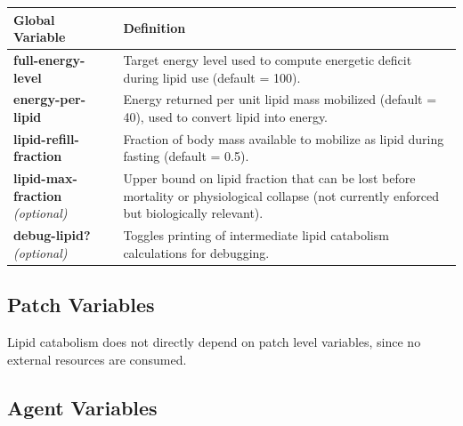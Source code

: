 \documentclass[
]{book}
\begin{document}
\begin{longtable}[]{@{}
  >{\raggedright\arraybackslash}p{}
  >{\raggedright\arraybackslash}p{}@{}}
\toprule\noalign{}
\begin{minipage}[b]{\linewidth}\raggedright
Global Variable
\end{minipage} & \begin{minipage}[b]{\linewidth}\raggedright
Definition
\end{minipage} \\
\midrule\noalign{}
\endhead
\bottomrule\noalign{}
\endlastfoot
\textbf{full-energy-level} & Target energy level used to compute energetic deficit during lipid use (default = 100). \\
\textbf{energy-per-lipid} & Energy returned per unit lipid mass mobilized (default = 40), used to convert lipid into energy. \\
\textbf{lipid-refill-fraction} & Fraction of body mass available to mobilize as lipid during fasting (default = 0.5). \\
\textbf{lipid-max-fraction} \emph{(optional)} & Upper bound on lipid fraction that can be lost before mortality or physiological collapse (not currently enforced but biologically relevant). \\
\textbf{debug-lipid?} \emph{(optional)} & Toggles printing of intermediate lipid catabolism calculations for debugging. \\
\end{longtable}

\subsection{Patch Variables}\label{patch-variables-6}

Lipid catabolism does not directly depend on patch level variables, since no external resources are consumed.

\subsection{Agent Variables}\label{agent-variables-6}
\end{document}
